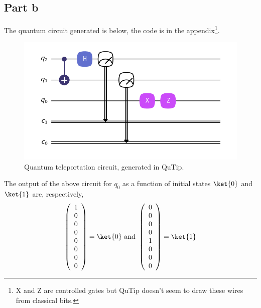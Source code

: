 \subsection*{Part b}
The quantum circuit generated is below, the code is in the appendix\footnote{X and Z are controlled gates but QuTip doesn't seem to draw these wires from classical bits.}.
\begin{figure}[H]
    \centering
    \includegraphics[width=1\linewidth]{Resources//245//Homework 8/245 Homework 8 Problem 2b.png}
    \caption{Quantum teleportation circuit, generated in QuTip.}
\end{figure}
The output of the above circuit for $q_0$ as a function of initial states $\ket{0}$ and $\ket{1}$ are, respectively,
$$\left(\begin{array}{cc}1\\0\\0\\0\\0\\0\\0\\0\end{array}\right) = \ket{0} \textrm{ and }\left(\begin{array}{cc}0\\0\\0\\0\\1\\0\\0\\0\end{array}\right) = \ket{1}$$
\pagebreak
